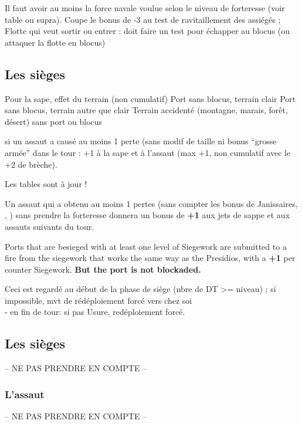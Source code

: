 \iamhere

\aparag[Blocus]
Il faut avoir au moins la force navale voulue selon le niveau de forteresse
(voir table ou supra).
\bparag Coupe le bonus de -3 au test de ravitaillement des assiégés ;
\bparag Flotte qui veut sortir ou entrer : doit faire un test pour échapper au blocus
(ou attaquer la flotte en blocus)

\subsection{Les sièges}
\aparag Pour la sape, effet du terrain (non cumulatif)
      Port sans blocus, terrain clair
      Port sans blocus, terrain autre que clair
 Terrain accidenté (montagne, marais, forêt, désert) sans port
ou blocus

\aparag[TBD] si un assaut a causé au moins 1 perte (sans modif de
taille ni bonus ``grosse armée'' dans le tour : +1 à la sape et à
l'assaut (max +1, non cumulatif avec le +2 de brèche).


\aparag Les tables sont à jour !

\aparag[Expérimental]
Un assaut qui a obtenu au moins 1 pertes (sans compter les bonus
de Janissaires, \RUS, \POL) sans prendre la forteresse donnera un
bonus de {\bf +1} aux jets de sappe et aux assauts suivants du tour.

Ports that are besieged with at least one level of Siegework are
submitted to a fire from the siegework that works the same way as the
Presidios, with a {\bf +1} per counter Siegework\faceplus.  {\bf But the
 port is not blockaded.}

Ceci est regardé au début de la phase de siège (nbre de DT >= niveau) ;
si impossible, mvt de rédéploiement forcé vers chez soi \\
- en fin de tour: si pas Usure\faceplus, redéploiement forcé.


\subsection{Les sièges}
-- NE PAS PRENDRE EN COMPTE --


\subsubsection{L'assaut}
-- NE PAS PRENDRE EN COMPTE --


